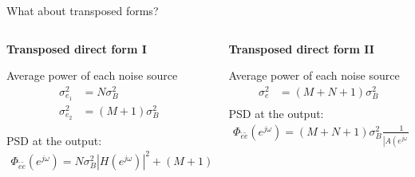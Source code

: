 \documentclass[10pt]{beamer}
\begin{document}
\begin{frame}{What about transposed forms?}
	\begin{columns}[t]
		\begin{column}{0.5\textwidth}
			\textbf{Transposed direct form I}
			\begin{center}
				\resizebox{1.2\textwidth}{!}{}
			\end{center}
			Average power of each noise source
			\onslide<3|handout:0> {
			\begin{align*}
				\sigma_{e_1}^2 &= N\sigma_B^2 \\
				\sigma_{e_2}^2 &= (M+1)\sigma_B^2
			\end{align*}
			}
			
			PSD at the output:
			\onslide<3|handout:0> {
			\begin{align*}
				\Phi_{\tilde{e}\tilde{e}}(e^{j\omega}) = N\sigma_B^2|H(e^{j\omega})|^2 + (M+1)\sigma_B^2
			\end{align*}
			}
		
		\end{column}
		\begin{column}{0.5\textwidth}
			\textbf{Transposed direct form II}
			\vspace{-0.07cm}
			\begin{center}
				\resizebox{\textwidth}{!}{}
			\end{center}
			Average power of each noise source
			\onslide<3|handout:0> {
				\begin{align*}
				\sigma_{e}^2 &= (M+N+1)\sigma_B^2 \\
				\end{align*}
				\vspace{-0.2cm}
			}
			PSD at the output:
			\onslide<3|handout:0> {
				\begin{align*}
				\Phi_{\tilde{e}\tilde{e}}(e^{j\omega}) = (M+N+1)\sigma_B^2\frac{1}{|A(e^{j\omega})|^2}
				\end{align*}
			}
		\end{column}
	\end{columns}
\end{frame}
\end{document}

